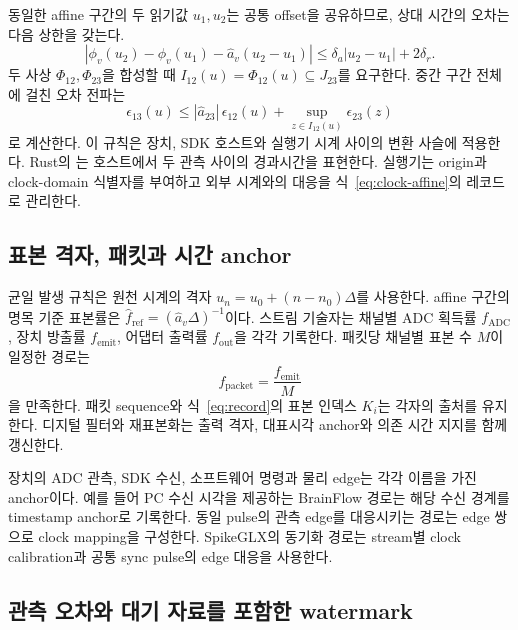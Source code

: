 동일한 affine 구간의 두 읽기값 $u_1,u_2$는 공통 offset을 공유하므로,
상대 시간의 오차는 다음 상한을 갖는다.
\begin{equation}
 \left|
 \phi_v(u_2)-\phi_v(u_1)-\widehat a_v(u_2-u_1)
 \right|
 \le\delta_a|u_2-u_1|+2\delta_r.
 \label{eq:clock-relative}
\end{equation}
두 사상 $\Phi_{12},\Phi_{23}$을 합성할 때 $I_{12}(u)=\Phi_{12}(u)
\subseteq J_{23}$를 요구한다. 중간 구간 전체에 걸친 오차 전파는
\begin{equation}
 \epsilon_{13}(u)\le
 |\widehat a_{23}|\,\epsilon_{12}(u)
 +\sup_{z\in I_{12}(u)}\epsilon_{23}(z)
 \label{eq:clock-compose}
\end{equation}
로 계산한다. 이 규칙은 장치, SDK 호스트와 실행기 시계 사이의 변환 사슬에 적용한다.
Rust의 는 호스트에서 두 관측 사이의 경과시간을 표현한다.
실행기는 origin과 clock-domain 식별자를 부여하고 외부 시계와의 대응을
식~\eqref{eq:clock-affine}의 레코드로 관리한다\citep{rust_instant}.

\subsection{표본 격자, 패킷과 시간 anchor}

균일 발생 규칙은 원천 시계의 격자
$u_n=u_0+(n-n_0)\Delta$를 사용한다.
affine 구간의 명목 기준 표본률은
$\widehat f_{\mathrm{ref}}=(\widehat a_v\Delta)^{-1}$이다.
스트림 기술자는 채널별 ADC 획득률 $f_{\mathrm{ADC}}$,
장치 방출률 $f_{\mathrm{emit}}$, 어댑터 출력률 $f_{\mathrm{out}}$을 각각 기록한다.
패킷당 채널별 표본 수 $M$이 일정한 경로는
\begin{equation}
 f_{\mathrm{packet}}=\frac{f_{\mathrm{emit}}}{M}
 \label{eq:packet-rate}
\end{equation}
을 만족한다. 패킷 sequence와 식~\eqref{eq:record}의 표본 인덱스 $K_i$는
각자의 출처를 유지한다. 디지털 필터와 재표본화는 출력 격자,
대표시각 anchor와 의존 시간 지지를 함께 갱신한다.

장치의 ADC 관측, SDK 수신, 소프트웨어 명령과 물리 edge는 각각 이름을 가진 anchor이다.
예를 들어 PC 수신 시각을 제공하는 BrainFlow 경로는 해당 수신 경계를
timestamp anchor로 기록한다\citep{brainflow_data}.
동일 pulse의 관측 edge를 대응시키는 경로는 edge 쌍으로 clock mapping을 구성한다.
SpikeGLX의 동기화 경로는 stream별 clock calibration과 공통 sync pulse의
edge 대응을 사용한다\citep{spikeglx_manual}.

\subsection{관측 오차와 대기 자료를 포함한 watermark}

